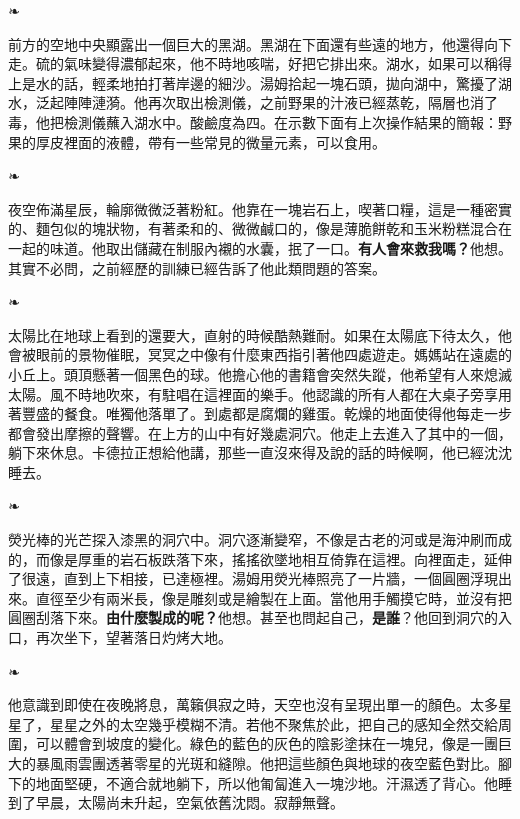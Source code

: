 \documentclass[10pt]{article}
\begin{document}
\begin{center}❧\end{center}

前方的空地中央顯露出一個巨大的黑湖。黑湖在下面還有些遠的地方，他還得向下走。硫的氣味變得濃郁起來，他不時地咳喘，好把它排出來。湖水，如果可以稱得上是水的話，輕柔地拍打著岸邊的細沙。湯姆拾起一塊石頭，拋向湖中，驚擾了湖水，泛起陣陣漣漪。他再次取出檢測儀，之前野果的汁液已經蒸乾，隔層也消了毒，他把檢測儀蘸入湖水中。酸鹼度為四。在示數下面有上次操作結果的簡報：野果的厚皮裡面的液體，帶有一些常見的微量元素，可以食用。

\begin{center}❧\end{center}

夜空佈滿星辰，輪廓微微泛著粉紅。他靠在一塊岩石上，喫著口糧，這是一種密實的、麵包似的塊狀物，有著柔和的、微微鹹口的，像是薄脆餅乾和玉米粉糕混合在一起的味道。他取出儲藏在制服內襯的水囊，抿了一口。\textbf{有人會來救我嗎？}他想。其實不必問，之前經歷的訓練已經告訴了他此類問題的答案。

\begin{center}❧\end{center}

太陽比在地球上看到的還要大，直射的時候酷熱難耐。如果在太陽底下待太久，他會被眼前的景物催眠，冥冥之中像有什麼東西指引著他四處遊走。媽媽站在遠處的小丘上。頭頂懸著一個黑色的球。他擔心他的書籍會突然失蹤，他希望有人來熄滅太陽。風不時地吹來，有駐唱在這裡面的樂手。他認識的所有人都在大桌子旁享用著豐盛的餐食。唯獨他落單了。到處都是腐爛的雞蛋。乾燥的地面使得他每走一步都會發出摩擦的聲響。在上方的山中有好幾處洞穴。他走上去進入了其中的一個，躺下來休息。卡德拉正想給他講，那些一直沒來得及說的話的時候啊，他已經沈沈睡去。

\begin{center}❧\end{center}

熒光棒的光芒探入漆黑的洞穴中。洞穴逐漸變窄，不像是古老的河或是海沖刷而成的，而像是厚重的岩石板跌落下來，搖搖欲墜地相互倚靠在這裡。向裡面走，延伸了很遠，直到上下相接，已達極裡。湯姆用熒光棒照亮了一片牆，一個圓圈浮現出來。直徑至少有兩米長，像是雕刻或是繪製在上面。當他用手觸摸它時，並沒有把圓圈刮落下來。\textbf{由什麼製成的呢？}他想。甚至也問起自己，\textbf{是誰}？他回到洞穴的入口，再次坐下，望著落日灼烤大地。

\begin{center}❧\end{center}

他意識到即使在夜晚將息，萬籟俱寂之時，天空也沒有呈現出單一的顏色。太多星星了，星星之外的太空幾乎模糊不清。若他不聚焦於此，把自己的感知全然交給周圍，可以體會到坡度的變化。綠色的藍色的灰色的陰影塗抹在一塊兒，像是一團巨大的暴風雨雲團透著零星的光斑和縫隙。他把這些顏色與地球的夜空藍色對比。腳下的地面堅硬，不適合就地躺下，所以他匍匐進入一塊沙地。汗濕透了背心。他睡到了早晨，太陽尚未升起，空氣依舊沈悶。寂靜無聲。
\end{document}
